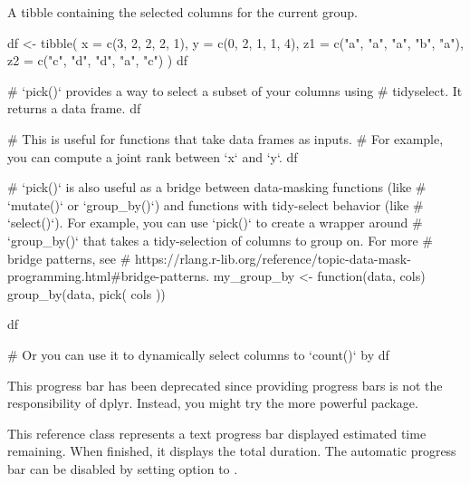 \documentclass[a4paper]{book}
\begin{document}
%
\begin{Value}
A tibble containing the selected columns for the current group.
\end{Value}
%
\begin{SeeAlso}
\end{SeeAlso}
%
\begin{Examples}
\begin{ExampleCode}
df <- tibble(
  x = c(3, 2, 2, 2, 1),
  y = c(0, 2, 1, 1, 4),
  z1 = c("a", "a", "a", "b", "a"),
  z2 = c("c", "d", "d", "a", "c")
)
df

# `pick()` provides a way to select a subset of your columns using
# tidyselect. It returns a data frame.
df %

# This is useful for functions that take data frames as inputs.
# For example, you can compute a joint rank between `x` and `y`.
df %

# `pick()` is also useful as a bridge between data-masking functions (like
# `mutate()` or `group_by()`) and functions with tidy-select behavior (like
# `select()`). For example, you can use `pick()` to create a wrapper around
# `group_by()` that takes a tidy-selection of columns to group on. For more
# bridge patterns, see
# https://rlang.r-lib.org/reference/topic-data-mask-programming.html#bridge-patterns.
my_group_by <- function(data, cols) {
  group_by(data, pick({{ cols }}))
}

df %

# Or you can use it to dynamically select columns to `count()` by
df %
\end{ExampleCode}
\end{Examples}
%
\begin{Description}
\strong{[Deprecated]}

This progress bar has been deprecated since providing progress bars is not
the responsibility of dplyr. Instead, you might try the more powerful
 package.

This reference class represents a text progress bar displayed estimated
time remaining. When finished, it displays the total duration.  The
automatic progress bar can be disabled by setting option
 to .
\end{Description}
\end{document}
